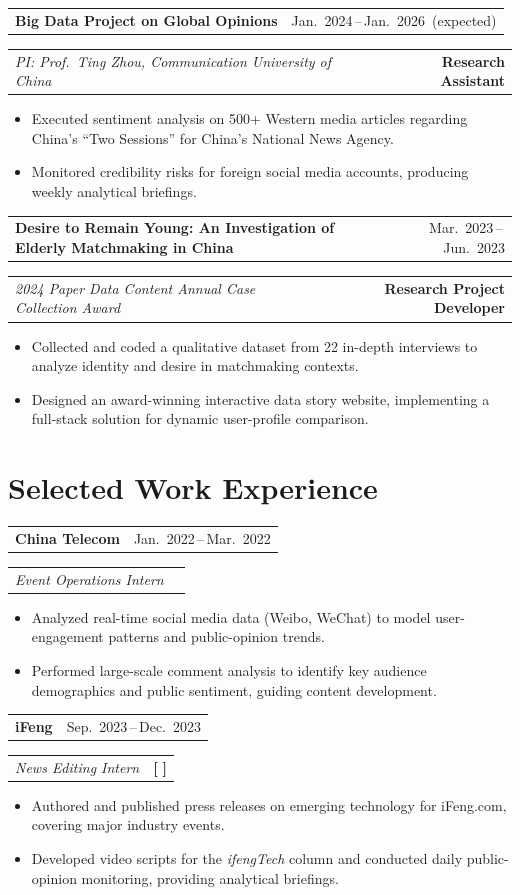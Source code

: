 \documentclass[a4paper,11pt]{article}
\makeatletter
\newcommand{\entryhead}[2]{%
  \par\vspace{6pt}
  \noindent\begin{tabularx}{\linewidth}{@{}X r@{}}
    {\large\bfseries\color{body}#1} & {\small\color{muted}\sffamily #2} \\
  \end{tabularx}\par\vspace{2pt}
}
\newcommand{\entrymeta}[2]{%
  \noindent\begin{tabularx}{\linewidth}{@{}X r@{}}
    {\normalsize\itshape\color{body} #1} & {\small\color{muted}\textbf{#2}} \\
  \end{tabularx}\par\vspace{4pt}
}
\makeatother
\begin{document}
\entryhead{Big Data Project on Global Opinions}{Jan.\ 2024\,--\,Jan.\ 2026 \,(expected)}
\entrymeta{PI: Prof.\ Ting Zhou, Communication University of China}{\textbf{Research Assistant}}
\begin{itemize}
  \item Executed sentiment analysis on 500+ Western media articles regarding China's ``Two Sessions'' for China's National News Agency.
  \item Monitored credibility risks for foreign social media accounts, producing weekly analytical briefings.
\end{itemize}

\entryhead{Desire to Remain Young: An Investigation of Elderly Matchmaking in China}{Mar.\ 2023\,--\,Jun.\ 2023}
\entrymeta{2024 Paper Data Content Annual Case Collection Award}{\textbf{Research Project Developer}}
\begin{itemize}
  \item Collected and coded a qualitative dataset from 22 in-depth interviews to analyze identity and desire in matchmaking contexts.
  \item Designed an award-winning interactive data story website, implementing a full-stack solution for dynamic user-profile comparison.
\end{itemize}

\section{Selected Work Experience}

\entryhead{China Telecom}{Jan.\ 2022\,--\,Mar.\ 2022}
\entrymeta{Event Operations Intern}{}
\begin{itemize}
  \item Analyzed real-time social media data (Weibo, WeChat) to model user-engagement patterns and public-opinion trends.
  \item Performed large-scale comment analysis to identify key audience demographics and public sentiment, guiding content development.
\end{itemize}

\entryhead{iFeng}{Sep.\ 2023\,--\,Dec.\ 2023}
\entrymeta{News Editing Intern}{[\,\href{https://some-link.com}{\faGlobe}\,]}
\begin{itemize}
  \item Authored and published press releases on emerging technology for iFeng.com, covering major industry events.
  \item Developed video scripts for the \textit{ifengTech} column and conducted daily public-opinion monitoring, providing analytical briefings.
\end{itemize}
\end{document}
